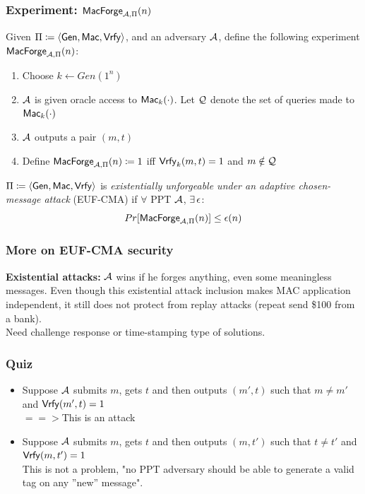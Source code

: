 \documentclass[12pt]{article}
\begin{document}
\subsubsection{Experiment: $\mathsf{MacForge}_{\mathcal{A},\Pi}(n)$}
Given $\Pi \coloneqq \langle \operatorname{\mathsf{Gen}}, \operatorname{\mathsf{Mac}}, \operatorname{\mathsf{Vrfy}} \rangle$, and an adversary $\mathcal{A}$, define the following experiment $\mathsf{MacForge}_{\mathcal{A},\Pi}(n)$:
\begin{enumerate}
\item Choose $k\leftarrow Gen(1^n)$
\item $\mathcal{A}$ is given oracle access to $\operatorname{\mathsf{Mac}}_k(\cdot)$. Let $\mathcal{Q}$ denote the set of queries made to $\operatorname{\mathsf{Mac}}_k(\cdot)$
\item $\mathcal{A}$ outputs a pair $(m,t)$
\item Define $\mathsf{MacForge}_{\mathcal{A},\Pi}(n) \coloneqq 1$ iff $\operatorname{\mathsf{Vrfy}}_k(m,t)=1$ and $m \notin \mathcal{Q}$
\end{enumerate}
\newpage
$\Pi \coloneqq \langle \operatorname{\mathsf{Gen}}, \operatorname{\mathsf{Mac}}, \operatorname{\mathsf{Vrfy}} \rangle$ is \emph{existentially unforgeable under an adaptive chosen-message attack} (EUF-CMA) if $\forall$ PPT $\mathcal{A}$, $\exists\,\epsilon$:
\begin{equation*}
Pr[\mathsf{MacForge}_{\mathcal{A},\Pi}(n)] \le \epsilon(n)
\end{equation*}

\subsubsection{More on EUF-CMA security}
\textbf{Existential attacks:} $\mathcal{A}$ wins if he forges anything, even some meaningless messages.
Even though this existential attack inclusion makes MAC application independent, it still does not protect from replay attacks (repeat send \$100 from a bank).\\
Need challenge response or time-stamping type of solutions.

\subsubsection*{Quiz}
\begin{itemize}
\item Suppose $\mathcal{A}$ submits $m$, gets $t$ and then outputs $(m',t)$ such that $m\neq m'$ and $\operatorname{\mathsf{Vrfy}}(m',t)=1$\\
\quad $==>$This is an attack
\item Suppose $\mathcal{A}$ submits $m$, gets $t$ and then outputs $(m,t')$ such that $t\neq t'$ and $\operatorname{\mathsf{Vrfy}}(m,t')=1$\\
This is not a problem, "no PPT adversary should be able to generate a valid tag on any ”new” message".
\end{itemize}
\end{document}
